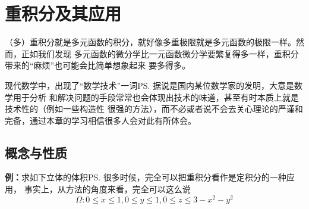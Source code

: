 \setcounter{chapter}{10}

\chapter{重积分及其应用}

（多）重积分就是多元函数的积分，就好像多重极限就是多元函数的极限一样。然而，正如我们发现
多元函数的微分学比一元函数微分学要繁复得多一样，重积分带来的“麻烦”也可能会比简单想象起来
要多得多。

现代数学中，出现了“数学技术”一词\ps{据说是国内某位数学家的发明}，大意是数学用于分析
和解决问题的手段常常也会体现出技术的味道，甚至有时本质上就是技术性的（例如一些构造性
很强的方法），而不必或者说不会去关心理论的严谨和完备，通过本章的学习相信很多人会对此有所体会。



\section{概念与性质}

{\bf 例：}求如下立体的体积\ps{很多时候，完全可以把重积分看作是定积分的一种应用，
事实上，从方法的角度来看，完全可以这么说}
$$\Omega:0\leq x\leq 1,0\leq y\leq 1,0\leq z\leq 3-x^2-y^2$$

